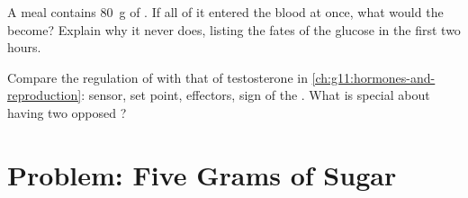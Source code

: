 \begin{exercise}[$\star\star\star$]\label{exo:g12:glucose-and-diabetes:14}
A meal contains \qty{80}{g} of . If all of it entered the
blood at once, what would the  become? Explain why it never
does, listing the fates of the glucose in the first two hours.
\end{exercise}

\begin{exercise}[$\star\star\star$]\label{exo:g12:glucose-and-diabetes:15}
Compare the regulation of  with that of testosterone in
\cref{ch:g11:hormones-and-reproduction}: sensor, set point,
effectors, sign of the . What is special about having two
opposed ?
\end{exercise}

\section{Problem: Five Grams of Sugar}

